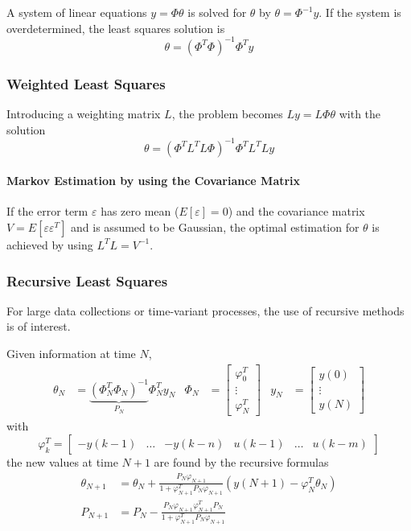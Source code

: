 A system of linear equations $y = \Phi \theta$ is solved for $\theta$ by 
$\theta = \Phi^{-1} y$.
If the system is overdetermined, the least squares solution is
\[
    \theta = (\Phi^T \Phi)^{-1} \Phi^T y
\]

\subsubsection{Weighted Least Squares}
Introducing a weighting matrix $L$, the problem becomes $L y = L \Phi \theta$
with the solution
\[
    \theta = (\Phi^T L^T L \Phi)^{-1} \Phi^T L^T L y
\]

\paragraph{Markov Estimation by using the Covariance Matrix}
If the error term $\varepsilon$ has zero mean ($E[\varepsilon]=0$) and the
covariance matrix $V = E[\varepsilon\varepsilon^T]$ and is assumed to be
Gaussian, the optimal estimation for $\theta$ is achieved by using
$L^T L = V^{-1}$.

\subsubsection{Recursive Least Squares}
For large data collections or time-variant processes, the use of recursive methods is of interest.

Given information at time $N$,
\begin{align*}
    \theta_N &= \underbrace{(\Phi_N^T \Phi_N)^{-1}}_{P_N} \Phi_N^T y_N &
    \Phi_N &= \begin{bmatrix} \varphi_0^T \\ \vdots \\ \varphi_N^T \end{bmatrix} &
    y_N &= \begin{bmatrix} y(0) \\ \vdots \\ y(N) \end{bmatrix}
\end{align*}
with
\[
    \varphi_k^T = \begin{bmatrix}
    -y(k-1) & \dots & -y(k-n) & u(k-1) & \dots & u(k-m)
    \end{bmatrix}
\]
the new values at time $N+1$ are found by the recursive formulas
\begin{align*}
    \theta_{N+1} &= \theta_N + \frac{P_N \varphi_{N+1}}{1 + \varphi_{N+1}^T P_N \varphi_{N+1}}\left( y(N+1) - \varphi_N^T \theta_N \right) \\
    P_{N+1} &= P_N - \frac{P_N \varphi_{N+1} \varphi_{N+1}^T P_N}{1 + \varphi_{N+1}^T P_N \varphi_{N+1}}
\end{align*}

